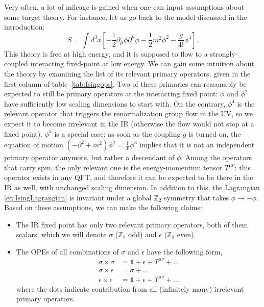 \documentclass[a4paper,12pt]{article}
\numberwithin{equation}{section}
\begin{document}
Very often, a lot of mileage is gained when one can input assumptions about some target theory. For instance, let us go back to the model discussed in the introduction:
\begin{equation}
	S = \int d^3x \left[
	-\frac{1}{2} \partial_\mu \phi \partial^\mu \phi
	- \frac{1}{2} m^2 \phi^2 - \frac{g}{4!} \phi^4 \right].
	\label{eq:IsingLagrangian}
\end{equation}
This theory is free at high energy, and it is supposed to flow to a strongly-coupled interacting fixed-point at low energy.
We can gain some intuition about the theory by examining the list of its relevant primary operators, given in the first column of table~\ref{tab:Isingops}. Two of these primaries can reasonably be expected to still be primary operators at the interacting fixed point: $\phi$ and $\phi^2$ have sufficiently low scaling dimensions to start with. On the contrary, $\phi^4$ is the relevant operator that triggers the renormalization group flow in the UV, so we expect it to become irrelevant in the IR (otherwise the flow would not stop at a fixed point). $\phi^3$ is a special case: as soon as the coupling $g$ is turned on, the equation of motion $(-\partial^2 + m^2) \phi^2 = \frac{1}{3!} \phi^3$ implies that it is not an independent primary operator anymore, but rather a descendant of $\phi$.
Among the operators that carry spin, the only relevant one is the energy-momentum tensor $T^{\mu\nu}$: this operator exists in any QFT, and therefore it can be expected to be there in the IR as well, with unchanged scaling dimension.
In addition to this, the Lagrangian \eqref{eq:IsingLagrangian} is invariant under a global $\mathbb{Z}_2$ symmetry that takes $\phi \to -\phi$. Based on these assumptions, we can make the following claims:
\begin{itemize}

\item
The IR fixed point has only two relevant primary operators, both of them scalars, which we will denote $\sigma$ ($\mathbb{Z}_2$ odd) and $\epsilon$ ($\mathbb{Z}_2$ even).

\item
The OPEs of all combinations of $\sigma$ and $\epsilon$ have the following form,
\begin{align}
	\sigma \times \sigma &= \mathds{1} + \epsilon + T^{\mu\nu} + \ldots
	\nonumber \\
	\sigma \times \epsilon &= \sigma + \ldots
	\label{eq:IsingOPE}
	\\
	\epsilon \times \epsilon &=
	\mathds{1} + \epsilon + T^{\mu\nu} + \ldots
	\nonumber
\end{align}
where the dots indicate contribution from all (infinitely many) irrelevant primary operators.

\end{itemize}
\end{document}
